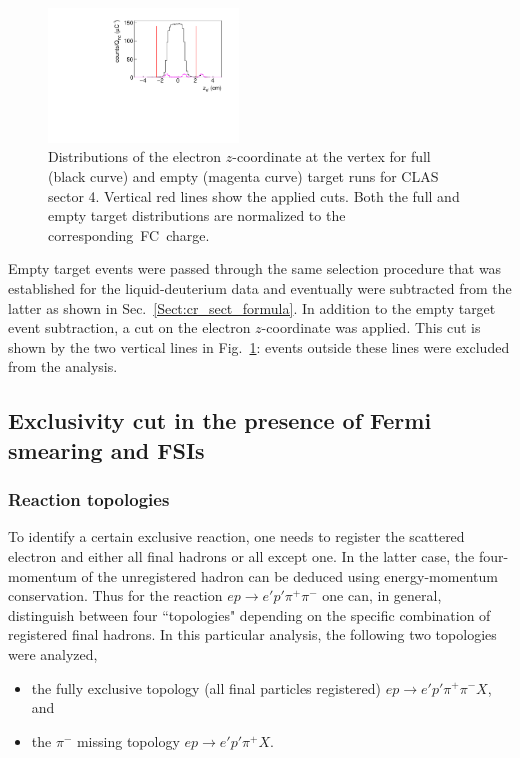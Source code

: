 \documentclass[prc,twocolumn,superscriptaddress,showpacs,amssymb,amsmath,amsfonts,aps,nofootinbib]{revtex4-1}
\begin{document}
\begin{figure}[htp]
\begin{center}
 \includegraphics[width=0.45\textwidth,keepaspectratio]{pictures/event_selection/z_vertex.pdf}
\vspace{-0.1cm}
\caption{Distributions of the electron $z$-coordinate at the vertex for full (black curve) and empty (magenta curve) target runs for CLAS sector 4. Vertical red lines show the applied cuts. Both the full and empty target distributions are normalized to the corresponding~FC~charge.  }
\label{fig:z_vertex}
\end{center}
\end{figure}

Empty target events were passed through the same selection procedure that was established for the liquid-deuterium data and eventually were subtracted from the latter as shown in Sec.\!~\ref{Sect:cr_sect_formula}. In addition to the empty target event subtraction, a cut on the electron $z$-coordinate was applied. This cut is shown by the two vertical lines in Fig.\!~\ref{fig:z_vertex}: events outside these lines were excluded from the analysis. 


\subsection{Exclusivity cut in the presence of Fermi smearing and FSIs}
\label{Sect:excl_cut}

\subsubsection{Reaction topologies}
\label{Sect:topologies}

To identify a certain exclusive reaction, one needs to register the scattered electron and either all final hadrons or all except one. In the latter case, the four-momentum of the unregistered hadron can be deduced using energy-momentum conservation. Thus for the reaction $e p \rightarrow e' p' \pi^{+} \pi^{-} $ one can, in general, distinguish between four ``topologies" depending on the specific combination of registered final hadrons. In this particular analysis, the following two topologies were analyzed,
\begin{itemize}
\item the fully exclusive topology (all final particles registered) $e p \rightarrow e' p' \pi^{+} \pi^{-} X$, and
\item the $\pi^{-}$ missing topology $e p \rightarrow e' p' \pi^{+} X$.
\end{itemize} %
\end{document}
